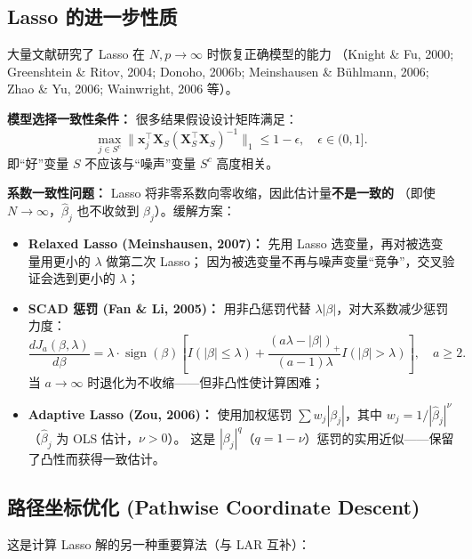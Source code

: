 \subsection{Lasso 的进一步性质}

大量文献研究了 Lasso 在 $N, p \to \infty$ 时恢复正确模型的能力
（Knight \& Fu, 2000; Greenshtein \& Ritov, 2004; Donoho, 2006b;
Meinshausen \& B\"uhlmann, 2006; Zhao \& Yu, 2006; Wainwright, 2006 等）。

\textbf{模型选择一致性条件：} 很多结果假设设计矩阵满足：
\[
    \max_{j \in S^c} \big\| \mathbf{x}_j^\top \mathbf{X}_S (\mathbf{X}_S^\top \mathbf{X}_S)^{-1} \big\|_1
    \le 1 - \epsilon,\quad \epsilon \in (0, 1].
\]
即``好''变量 $S$ 不应该与``噪声''变量 $S^c$ 高度相关。

\textbf{系数一致性问题：} Lasso 将非零系数向零收缩，因此估计量\textbf{不是一致的}
（即使 $N \to \infty$，$\hat{\beta}_j$ 也不收敛到 $\beta_j$）。缓解方案：

\begin{itemize}
    \item \textbf{Relaxed Lasso (Meinshausen, 2007)：}
    先用 Lasso 选变量，再对被选变量用更小的 $\lambda$ 做第二次 Lasso；
    因为被选变量不再与噪声变量``竞争''，交叉验证会选到更小的 $\lambda$；
    \item \textbf{SCAD 惩罚 (Fan \& Li, 2005)：}
    用非凸惩罚代替 $\lambda|\beta|$，对大系数减少惩罚力度：
    \begin{equation}
        \frac{d J_a(\beta, \lambda)}{d\beta}
        = \lambda \cdot \operatorname{sign}(\beta)
        \left[
            I(|\beta| \le \lambda)
            + \frac{(a\lambda - |\beta|)_+}{(a-1)\lambda}
            I(|\beta| > \lambda)
        \right], \quad a \ge 2.
    \end{equation}
    当 $a \to \infty$ 时退化为不收缩——但非凸性使计算困难；
    \item \textbf{Adaptive Lasso (Zou, 2006)：}
    使用加权惩罚 $\sum w_j|\beta_j|$，其中 $w_j = 1/|\hat{\beta}_j|^\nu$（$\hat{\beta}_j$ 为 OLS 估计，$\nu>0$）。
    这是 $|\beta_j|^q$（$q=1-\nu$）惩罚的实用近似——保留了凸性而获得一致估计。
\end{itemize}

\subsection{路径坐标优化 (Pathwise Coordinate Descent)}

这是计算 Lasso 解的另一种重要算法（与 LAR 互补）：

